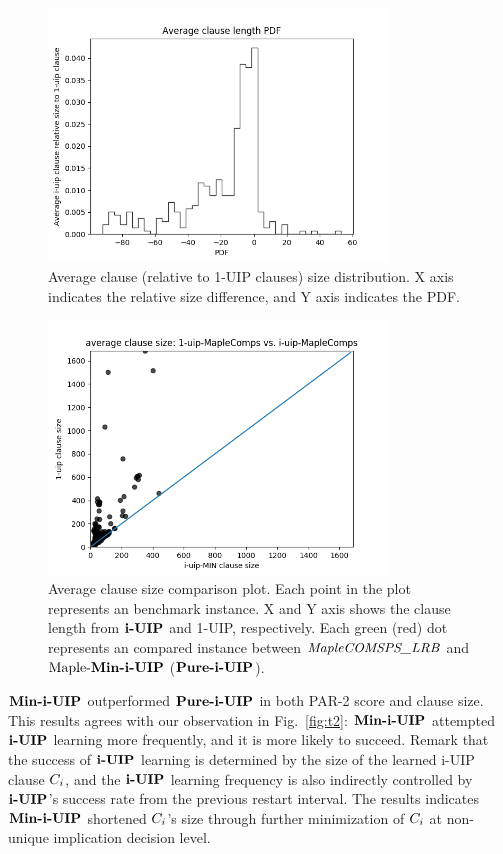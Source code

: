 \begin{figure}
    \centering
    \includegraphics[width=0.8\textwidth,natwidth=610,natheight=642]{clause_length_PDF.png}
    \caption{Average clause (relative to 1-UIP clauses) size distribution. X axis indicates the relative size difference, and Y axis indicates the PDF.}
     \label{fig:len_pdf}
\end{figure}
\begin{figure} \label{fig:len_compare}
    \centering
    \includegraphics[width=0.8\textwidth,natwidth=610,natheight=642]{i-uip-sizes-compare.png}
    \caption{Average clause size comparison plot. Each point in the plot represents an benchmark instance. X and Y axis shows the clause length from $\textbf{i-UIP}$ and 1-UIP, respectively. Each green (red) dot represents an compared instance between $\textit{MapleCOMSPS\_LRB}$ and $\text{Maple-\textbf{Min-i-UIP}}$ ($\textbf{Pure-i-UIP}$).   }
    \label{fig:len_compare}
\end{figure}


$\textbf{Min-i-UIP}$ outperformed $\textbf{Pure-i-UIP}$ in both PAR-2 score and clause size.  This results agrees with our observation in Fig.~\ref{fig:t2}: $\textbf{Min-i-UIP}$ attempted $\textbf{i-UIP}$ learning more frequently, and it is more likely to succeed. Remark that the success of $\textbf{i-UIP}$ learning is determined by the size of the learned i-UIP clause $C_{i}$, and the $\textbf{i-UIP}$ learning frequency is also indirectly controlled by $\textbf{i-UIP}$'s success rate from the previous restart interval. The results indicates  $\textbf{Min-i-UIP}$ shortened $C_{i}$'s size through further minimization of $C_{i}$ at non-unique implication decision level.



